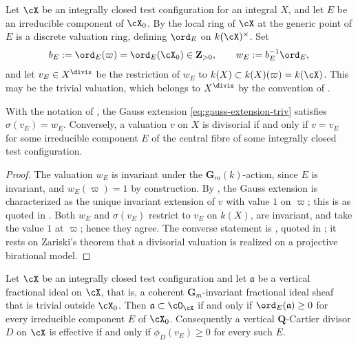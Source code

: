 \begin{definition}
\label{def:ch33-component-valuation}
Let $\cX$ be an integrally closed test configuration for an integral
$X$, and let $E$ be an irreducible component of $\cX_0$.  By
 the local ring of $\cX$ at
the generic point of $E$ is a discrete valuation ring, defining
$\ord_E$ on $k(\cX)^\times$.  Set
\begin{equation}
\label{eq:ch33-bE}
 b_E:=\ord_E(\varpi)=\ord_E(\cX_0)\in\mathbf Z_{>0},
 \qquad
 w_E:=b_E^{-1}\ord_E ,
\end{equation}
and let $v_E\in X^{\divis}$ be the restriction of $w_E$ to
$k(X)\subset k(X)(\varpi)=k(\cX)$.  This may be the trivial valuation,
which belongs to $X^{\divis}$ by the convention of
.
\end{definition}

\begin{lemma}\label{lem:ch33-gauss-component}
With the notation of , the Gauss
extension \eqref{eq:gauss-extension-triv} satisfies
$\sigma(v_E)=w_E$.  Conversely, a valuation $v$ on $X$ is divisorial
if and only if $v=v_E$ for some irreducible component $E$ of the central
fibre of some integrally closed test configuration.
\end{lemma}

\begin{proof}
The valuation $w_E$ is invariant under the $\mathbf G_m(k)$-action, since
$E$ is invariant, and $w_E(\varpi)=1$ by construction.  By
, the Gauss extension is characterized
as the unique invariant extension of $v$ with value $1$ on $\varpi$;
this is \cite[Lemma~4.2]{BHJ17} as quoted in \cite[\S1.3]{BJ22}.  Both
$w_E$ and $\sigma(v_E)$ restrict to $v_E$ on $k(X)$, are invariant,
and take the value $1$ at $\varpi$; hence they agree.  The converse
statement is \cite[Theorem~4.6]{BHJ17}, quoted in
\cite[Lemma~1.20]{BJ22}; it rests on Zariski's theorem that a divisorial
valuation is realized on a projective birational model.
\end{proof}

\begin{lemma}
\label{lem:ch33-effectivity}
Let $\cX$ be an integrally closed test configuration and let
$\mathfrak a$ be a vertical fractional ideal on $\cX$, that is, a
coherent $\mathbf G_m$-invariant fractional ideal sheaf that is trivial
outside $\cX_0$.  Then
$\mathfrak a\subset\cO_{\cX}$ if and only if $\ord_E(\mathfrak a)\geq0$
for every irreducible component $E$ of $\cX_0$.  Consequently a vertical
$\mathbf Q$-Cartier divisor $D$ on $\cX$ is effective if and only if
$\phi_D(v_E)\geq0$ for every such $E$.
\end{lemma}

